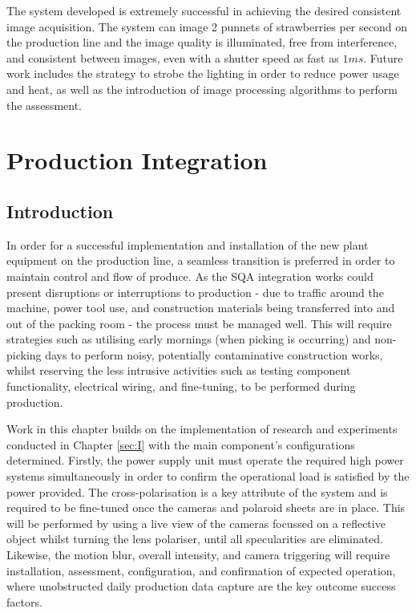 \documentclass[fleqn,twoside,12pt]{report}
\begin{document}
The system developed is extremely successful in achieving the desired consistent image acquisition. The system can image 2 punnets of strawberries per second on the production line and the image quality is illuminated, free from interference, and consistent between images, even with a shutter speed as fast as $1ms$. Future work includes the strategy to strobe the lighting in order to reduce power usage and heat, as well as the introduction of image processing algorithms to perform the assessment.




\newpage

\chapter{Production Integration}
\label{sec:II}

\section{Introduction}

In order for a successful implementation and installation of the new plant equipment on the production line, a seamless transition is preferred in order to maintain control and flow of produce. As the SQA integration works could present disruptions or interruptions to production - due to traffic around the machine, power tool use, and construction materials being transferred into and out of the packing room - the process must be managed well. This will require strategies such as utilising early mornings (when picking is occurring) and non-picking days to perform noisy, potentially contaminative construction works, whilst reserving the less intrusive activities such as testing component functionality, electrical wiring, and fine-tuning, to be performed during production.


Work in this chapter builds on the implementation of research and experiments conducted in Chapter \ref{sec:I} with the main component's configurations determined. Firstly, the power supply unit must operate the required high power systems simultaneously in order to confirm the operational load is satisfied by the power provided. The cross-polarisation is a key attribute of the system and is required to be fine-tuned once the cameras and polaroid sheets are in place. This will be performed by using a live view of the cameras focussed on a reflective object whilst turning the lens polariser, until all specularities are eliminated. Likewise, the motion blur, overall intensity, and camera triggering will require installation, assessment, configuration, and confirmation of expected operation, where unobstructed daily production data capture are the key outcome success factors.
\end{document}

